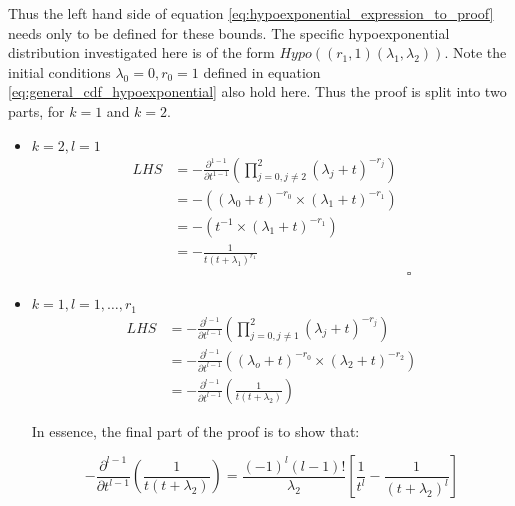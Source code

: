 Thus the left hand side of equation \ref{eq:hypoexponential_expression_to_proof}
needs only to be defined for these bounds.
The specific hypoexponential distribution investigated here is of the form
\(Hypo((r_1, 1)(\lambda_1, \lambda_2))\).
Note the initial conditions \(\lambda_0=0, r_0=1\) defined in equation
\ref{eq:general_cdf_hypoexponential} also hold here.
Thus the proof is split into two parts, for \(k=1\) and \(k=2\).



\begin{itemize}
    \item \(k = 2, l = 1\)
    \begin{equation*}
        \begin{split}
            LHS &= - \frac{\partial^{1-1}}{\partial t^{1-1}}
            \left( \prod_{j=0, j \neq 2}^{2} (\lambda_j + t)^{-r_j} \right) \\
            &=-\left( (\lambda_0 + t)^{-r_0} \times (\lambda_1 + t)^{-r_1}
            \right) \\
            &=-\left( t^{-1} \times (\lambda_1 + t)^{-r_1} \right) \\
            &= - \frac{1}{t(t + \lambda_1)^{r_1}} \\
            & \hspace{7cm} \square
        \end{split}
    \end{equation*}
    \item \(k = 1, l = 1, \dots, r_1\)
    \begin{equation*}
        \begin{split}
            LHS &= -\frac{\partial^{l-1}}{\partial t^{l-1}}
            \left( \prod_{j=0, j \neq 1}^{2} (\lambda_j + t)^{-r_j} \right) \\
            &= -\frac{\partial^{l-1}}{\partial t^{l-1}}
            \left( (\lambda_o + t)^{-r_0} \times (\lambda_2 + t)^{-r_2}
            \right) \\
            &= -\frac{\partial^{l-1}}{\partial t^{l-1}}
            \left( \frac{1}{t(t + \lambda_2)}\right)
        \end{split}
    \end{equation*}

    In essence, the final part of the proof is to show that:

    \[
        -\frac{\partial^{l-1}}{\partial t^{l-1}}
        \left( \frac{1}{t(t + \lambda_2)}\right) =
        \frac{(-1)^{l} (l-1)!}{\lambda_2}\left[\frac{1}{t^l} - \frac{1}{(t +
        \lambda_2)^l}\right]
    \]


\end{itemize}
